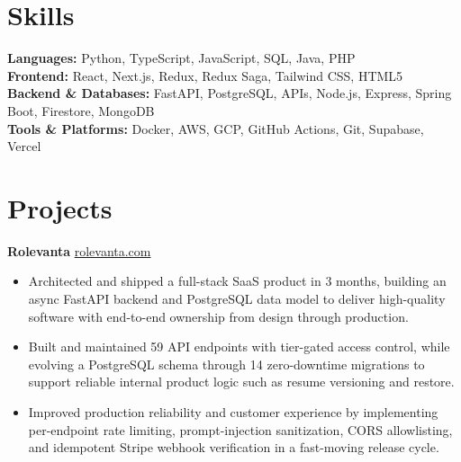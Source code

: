 \documentclass[11pt]{article}       %
\begin{document}
\vspace{-10.5pt}

\section*{Skills}
\textbf{Languages:} Python, TypeScript, JavaScript, SQL, Java, PHP \\
\textbf{Frontend:} React, Next.js, Redux, Redux Saga, Tailwind CSS, HTML5 \\
\textbf{Backend \& Databases:} FastAPI, PostgreSQL, APIs, Node.js, Express, Spring Boot, Firestore, MongoDB \\
\textbf{Tools \& Platforms:} Docker, AWS, GCP, GitHub Actions, Git, Supabase, Vercel
\vspace{-5pt}






\section*{Projects}
\textbf{Rolevanta} \hfill \href{https://rolevanta.com}{rolevanta.com} \\
\vspace{-9pt}
\begin{itemize}
  \item Architected and shipped a full-stack SaaS product in 3 months, building an async FastAPI backend and PostgreSQL data model to deliver high-quality software with end-to-end ownership from design through production.
  \item Built and maintained 59 API endpoints with tier-gated access control, while evolving a PostgreSQL schema through 14 zero-downtime migrations to support reliable internal product logic such as resume versioning and restore.
  \item Improved production reliability and customer experience by implementing per-endpoint rate limiting, prompt-injection sanitization, CORS allowlisting, and idempotent Stripe webhook verification in a fast-moving release cycle.
\end{itemize}
\end{document}
